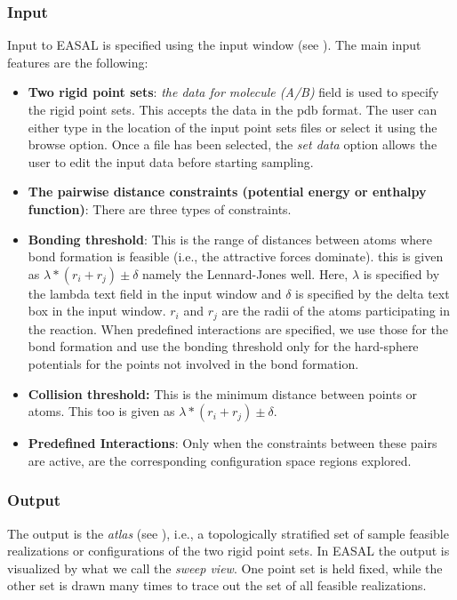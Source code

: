 \documentclass[10pt]{article}
\begin{document}
\subsubsection{Input}
Input to EASAL is specified using the input window (see ).
The main input features are the following:
\begin{itemize}
		\item \textbf{Two rigid point sets}: \emph{the data for molecule
		(A/B)} field is used to specify the rigid point sets. This accepts the
		data in the pdb format.  The user can either type in the location of
		the input point sets files or select it using the browse option. Once a
		file has been selected, the \emph{set data} option allows the user to edit
		the input data before starting sampling.
\item \textbf{The pairwise distance constraints (potential energy or enthalpy
		function)}: There are three types of constraints.

\item \textbf{Bonding threshold}: This is the range of distances between atoms
		where bond formation is feasible (i.e., the attractive forces dominate). 
		this is given as $\lambda*(r_i+r_j) 
		\pm \delta$ namely the Lennard-Jones well. 
		Here, $\lambda$ is specified by the lambda text field in
		the input window and $\delta$ is specified by the delta text box in the
		input window. $r_i$ and $r_j$ are the radii of the atoms participating
		in the reaction. When predefined interactions are specified, we use those
		for the bond formation and use the bonding threshold only for the hard-sphere
		potentials for the points not involved in the bond formation.

\item \textbf{Collision threshold:} This is the minimum distance between points
or atoms. This too is given as $\lambda*(r_i+r_j) \pm \delta$.
		
\item \textbf{Predefined Interactions}: Only when the constraints between these
pairs are active, are the corresponding configuration space regions explored. 
\end{itemize}

\subsubsection{Output}
The output is the \emph{atlas} (see ), i.e., a topologically stratified
set of sample feasible realizations or configurations of the two rigid point
sets. In EASAL the output is visualized by what we call the \emph{sweep view}. One
point set is  held fixed, while the other set is drawn many times to trace out
the set of all feasible realizations.
\end{document}
